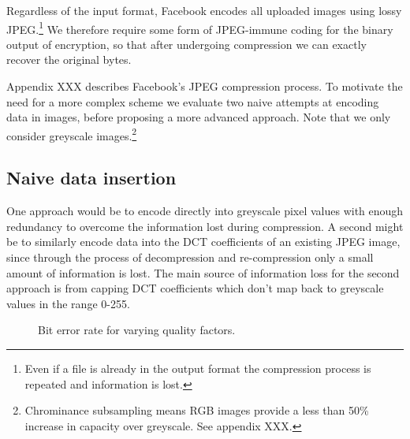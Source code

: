 
Regardless of the input format, Facebook encodes all uploaded images using lossy JPEG.\footnote{Even if a file is already in the output format the compression process is repeated and information is lost.} We therefore require some form of JPEG-immune coding for the binary output of encryption, so that after undergoing compression we can exactly recover the original bytes.

Appendix XXX describes Facebook's JPEG compression process. To motivate the need for a more complex scheme we evaluate two naive attempts at encoding data in images, before proposing a more advanced approach. Note that we only consider greyscale images.\footnote{Chrominance subsampling means RGB images provide a less than 50\% increase in capacity over greyscale. See appendix XXX.}


\subsection{Naive data insertion}
\label{ssec:naive}

One approach would be to encode directly into greyscale pixel values with enough redundancy to overcome the information lost during compression. A second might be to similarly encode data into the DCT coefficients of an existing JPEG image, since through the process of decompression and re-compression only a small amount of information is lost. The main source of information loss for the second approach is from capping DCT coefficients which don't map back to greyscale values in the range 0-255.

\begin{figure}[tbph]
  \begin{center}
    \caption{Bit error rate for varying quality factors.}
    \label{graph:ber0}
  \end{center}
\end{figure}

